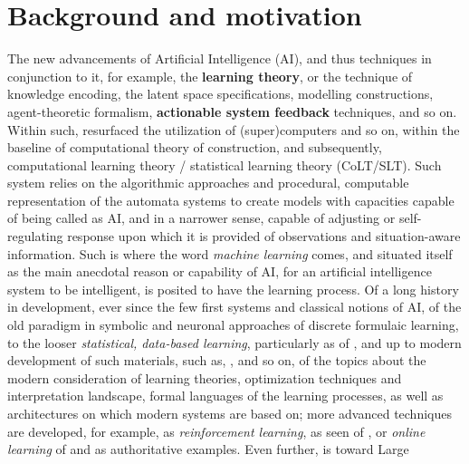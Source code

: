 \section{Background and motivation}

The new advancements of Artificial Intelligence (AI), and thus techniques in conjunction to it, for example, the \textbf{learning theory}, or the technique of knowledge encoding, the latent space specifications, modelling constructions, agent-theoretic formalism, \textbf{actionable system feedback} techniques, and so on. Within such, resurfaced the utilization of (super)computers and so on, within the baseline of computational theory of construction, and subsequently, computational learning theory / statistical learning theory (CoLT/SLT). Such system relies on the algorithmic approaches and procedural, computable representation of the automata systems to create models with capacities capable of being called as AI, and in a narrower sense, capable of adjusting or self-regulating response upon which it is provided of observations and situation-aware information. Such is where the word \textit{machine learning} comes, and situated itself as the main anecdotal reason or capability of AI, for an artificial intelligence system to be intelligent, is posited to have the learning process. Of a long history in development, ever since the few first systems and classical notions of AI, \cite{mcculloch_pitts_1943,Rosenblatt1958ThePA,minsky_papert_1969,hebb_1949,Robbins:1951,widrow_hoff_1960_adaline,Hestenes:1952} of the old paradigm in symbolic and neuronal approaches of discrete formulaic learning, to the looser \textit{statistical, data-based learning}, particularly as of \cite{10.1145/1968.1972,Vapnik1999-VAPTNO,10.5555/200548,hopfield_1982,fukushima_1980,cybenko_1989,bishop_1995,haykin_1994,kohonen_1982,6797087,nemirovski_yudin_1983,amari_rattray_saad_1998_natural_gradient_online,10.5555/2371238}, and up to modern development of such materials, such as, \cite{Jacot:2018:NTK,khan_bayesian_2024,buschjager_generalized_2020,Manin_2024,devlin_2018_bert,goodfellow2016deep,kaplan2020scalinglawsneurallanguage,Bronstein_2017,bronstein2021geometricdeeplearninggrids,luo1992convergence,tseng2001convergence,friedman2007pathwise,hu_model_2021,wright2015coordinate,janik2021complexitydeepneuralnetworks}, and so on, of the topics about the modern consideration of learning theories, optimization techniques and interpretation landscape, formal languages of the learning processes, as well as architectures on which modern systems are based on; more advanced techniques are developed, for example, as \textit{reinforcement learning}, as seen of \cite{sutton2018reinforcement,bertsekas1996neuro,bertsekas2019dynamic,szepesvari2010algorithms,lattimore2020bandit,kaelbling1996reinforcement,watkins1992q,bellman1957dynamic,williams1992simple,konda2000actor,mnih2015human,mnih2016asynchronous,silver2016mastering,schulman2015trust,schulman2017ppo,lillicrap2015ddpg,haarnoja2018soft,arulkumaran2017brief,ernst2005tree,fu2020d4rl,kostrikov2021offline}, or \textit{online learning} of \cite{shalev2012online,cesa2006prediction,zinkevich2003online,hazan2016introduction} and \cite{littlestone1994weighted} as authoritative examples. Even further, is toward Large 
